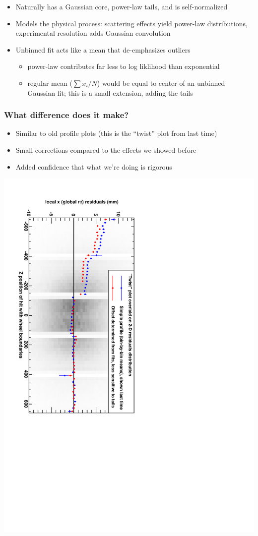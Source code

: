 \documentclass[compress]{beamer}
\begin{document}
\begin{frame}
\begin{itemize}
\item Naturally has a Gaussian core, power-law tails, and is self-normalized
\item Models the physical process: scattering effects yield power-law
  distributions, experimental resolution adds Gaussian convolution
\item Unbinned fit acts like a mean that de-emphasizes outliers
\begin{itemize}
\item power-law contributes far less to log liklihood than exponential
\item regular mean ($\sum x_i/N$) would be equal to center of an unbinned Gaussian fit; this is a small extension, adding the tails
\end{itemize}
\end{itemize}
\end{frame}


\begin{frame}
\frametitle{What difference does it make?}
\begin{itemize}
\item Similar to old profile plots (this is the ``twist'' plot from last time)
\item Small corrections compared to the effects we showed before
\item Added confidence that what we're doing is rigorous
\end{itemize}

\includegraphics[height=\linewidth, angle=90]{twist_fit_demonstration.pdf}
\end{frame}
\end{document}
